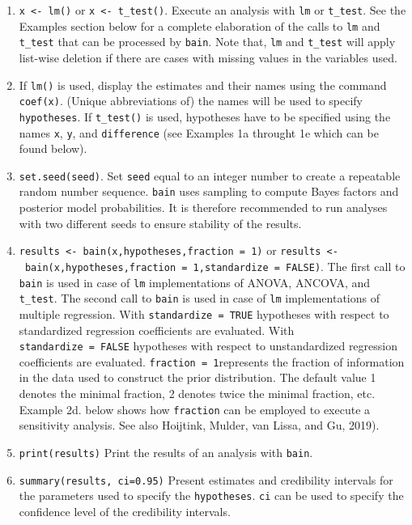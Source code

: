 \documentclass[
]{book}
\providecommand{\tightlist}{%
  \setlength{\itemsep}{0pt}\setlength{\parskip}{0pt}}
\begin{document}
\begin{enumerate}
\def\labelenumi{\arabic{enumi})}
\tightlist
\item
  \texttt{x\ \textless{}-\ lm()} or \texttt{x\ \textless{}-\ t\_test()}. Execute an analysis with
  \texttt{lm} or \texttt{t\_test}. See the Examples section below for a complete elaboration
  of the
  calls to \texttt{lm} and \texttt{t\_test} that can be processed by \texttt{bain}.
  Note that, \texttt{lm} and \texttt{t\_test} will apply list-wise deletion if there
  are cases with missing values in the variables used.
\item
  If \texttt{lm()} is used, display the estimates and their names using the command \texttt{coef(x)}. (Unique abbreviations of) the names will be used to specify \texttt{hypotheses}. If \texttt{t\_test()} is used, hypotheses have to be specified using the names \texttt{x}, \texttt{y}, and \texttt{difference} (see Examples 1a throught 1e which can be found below).
\item
  \texttt{set.seed(seed)}. Set \texttt{seed} equal to an integer
  number to create a repeatable random number sequence. \texttt{bain} uses sampling to compute Bayes factors and posterior model probabilities. It is therefore recommended to run analyses with two different seeds to ensure stability of the results.
\item
  \texttt{results\ \textless{}-\ bain(x,hypotheses,fraction\ =\ 1)} or \texttt{results\ \textless{}-\ bain(x,hypotheses,fraction\ =\ 1,standardize\ =\ FALSE)}. The first call to
  \texttt{bain} is used
  in case of \texttt{lm} implementations of ANOVA, ANCOVA, and \texttt{t\_test}. The
  second call to \texttt{bain} is used in case of \texttt{lm} implementations of
  multiple regression. With \texttt{standardize\ =\ TRUE} hypotheses with respect
  to standardized regression coefficients are evaluated. With \texttt{standardize\ =\ FALSE} hypotheses with respect to unstandardized regression coefficients
  are evaluated. \texttt{fraction\ =\ 1}represents the fraction of information in the data used to construct the prior distribution. The default value 1 denotes the minimal fraction, 2 denotes twice the minimal fraction, etc. Example 2d. below shows how \texttt{fraction} can be employed to execute a sensitivity analysis. See also Hoijtink, Mulder, van Lissa, and Gu, 2019).
\item
  \texttt{print(results)} Print the results of an analysis with
  \texttt{bain}.
\item
  \texttt{summary(results,\ ci=0.95)} Present estimates and credibility intervals for the parameters used to specify the \texttt{hypotheses}. \texttt{ci} can be used to specify the confidence level of the credibility intervals.
\end{enumerate}
\end{document}
